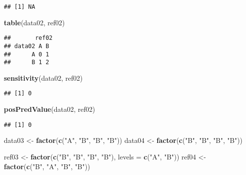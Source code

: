 \documentclass[
]{article}
\newenvironment{Shaded}{\begin{snugshade}}{\end{snugshade}}
\newcommand{\DataTypeTok}[1]{\textcolor[rgb]{0.13,0.29,0.53}{#1}}
\newcommand{\KeywordTok}[1]{\textcolor[rgb]{0.13,0.29,0.53}{\textbf{#1}}}
\newcommand{\NormalTok}[1]{#1}
\newcommand{\StringTok}[1]{\textcolor[rgb]{0.31,0.60,0.02}{#1}}
\begin{document}
\begin{verbatim}
## [1] NA
\end{verbatim}

\begin{Shaded}
\begin{Highlighting}[]
\KeywordTok{table}\NormalTok{(data02, ref02)}
\end{Highlighting}
\end{Shaded}

\begin{verbatim}
##       ref02
## data02 A B
##      A 0 1
##      B 1 2
\end{verbatim}

\begin{Shaded}
\begin{Highlighting}[]
\KeywordTok{sensitivity}\NormalTok{(data02, ref02) }
\end{Highlighting}
\end{Shaded}

\begin{verbatim}
## [1] 0
\end{verbatim}

\begin{Shaded}
\begin{Highlighting}[]
\KeywordTok{posPredValue}\NormalTok{(data02, ref02) }
\end{Highlighting}
\end{Shaded}

\begin{verbatim}
## [1] 0
\end{verbatim}

\begin{Shaded}
\begin{Highlighting}[]
\NormalTok{data03 <-}\StringTok{ }\KeywordTok{factor}\NormalTok{(}\KeywordTok{c}\NormalTok{(}\StringTok{"A"}\NormalTok{, }\StringTok{"B"}\NormalTok{, }\StringTok{"B"}\NormalTok{, }\StringTok{"B"}\NormalTok{))}
\NormalTok{data04 <-}\StringTok{ }\KeywordTok{factor}\NormalTok{(}\KeywordTok{c}\NormalTok{(}\StringTok{"B"}\NormalTok{, }\StringTok{"B"}\NormalTok{, }\StringTok{"B"}\NormalTok{, }\StringTok{"B"}\NormalTok{))}

\NormalTok{ref03 <-}\StringTok{ }\KeywordTok{factor}\NormalTok{(}\KeywordTok{c}\NormalTok{(}\StringTok{"B"}\NormalTok{, }\StringTok{"B"}\NormalTok{, }\StringTok{"B"}\NormalTok{, }\StringTok{"B"}\NormalTok{), }\DataTypeTok{levels =} \KeywordTok{c}\NormalTok{(}\StringTok{"A"}\NormalTok{, }\StringTok{"B"}\NormalTok{))}
\NormalTok{ref04 <-}\StringTok{ }\KeywordTok{factor}\NormalTok{(}\KeywordTok{c}\NormalTok{(}\StringTok{"B"}\NormalTok{, }\StringTok{"A"}\NormalTok{, }\StringTok{"B"}\NormalTok{, }\StringTok{"B"}\NormalTok{))}
\end{Highlighting}
\end{Shaded}
\end{document}
